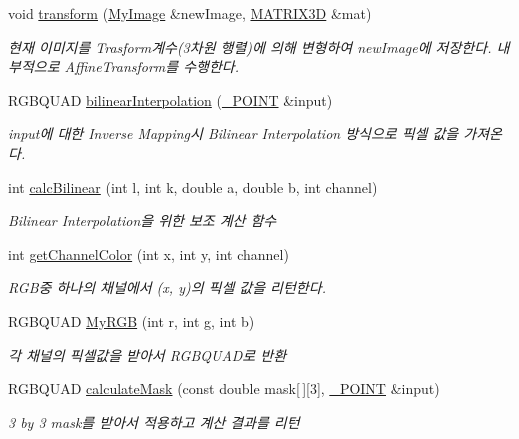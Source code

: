 \begin{DoxyCompactItemize}
\item 
void \hyperlink{class_my_image_a12bac49a024e6c9089a88adb6edca6e1}{transform} (\hyperlink{class_my_image}{My\-Image} \&new\-Image, \hyperlink{class_m_a_t_r_i_x3_d}{M\-A\-T\-R\-I\-X3\-D} \&mat)
\begin{DoxyCompactList}\small\item\em 현재 이미지를 Trasform계수(3차원 행렬)에 의해 변형하여 new\-Image에 저장한다. 내부적으로 Affine\-Transform를 수행한다. \end{DoxyCompactList}\item 
R\-G\-B\-Q\-U\-A\-D \hyperlink{class_my_image_a596dba2536ed1ae57835bf70fcfb1b69}{bilinear\-Interpolation} (\hyperlink{class___p_o_i_n_t}{\-\_\-\-P\-O\-I\-N\-T} \&input)
\begin{DoxyCompactList}\small\item\em input에 대한 Inverse Mapping시 Bilinear Interpolation 방식으로 픽셀 값을 가져온다. \end{DoxyCompactList}\item 
int \hyperlink{class_my_image_a7b7c78fb05bb1378e8ce2a24d8cd3920}{calc\-Bilinear} (int l, int k, double a, double b, int channel)
\begin{DoxyCompactList}\small\item\em Bilinear Interpolation을 위한 보조 계산 함수 \end{DoxyCompactList}\item 
int \hyperlink{class_my_image_af8815f475d86d16653e4295b94fba5af}{get\-Channel\-Color} (int x, int y, int channel)
\begin{DoxyCompactList}\small\item\em R\-G\-B중 하나의 채널에서 (x, y)의 픽셀 값을 리턴한다. \end{DoxyCompactList}\item 
R\-G\-B\-Q\-U\-A\-D \hyperlink{class_my_image_a6deaa1ee63f0944648c18c75a6955ada}{My\-R\-G\-B} (int r, int g, int b)
\begin{DoxyCompactList}\small\item\em 각 채널의 픽셀값을 받아서 R\-G\-B\-Q\-U\-A\-D로 반환 \end{DoxyCompactList}\item 
R\-G\-B\-Q\-U\-A\-D \hyperlink{class_my_image_afec37177692c60c74d1dfba40c890642}{calculate\-Mask} (const double mask\mbox{[}$\,$\mbox{]}\mbox{[}3\mbox{]}, \hyperlink{class___p_o_i_n_t}{\-\_\-\-P\-O\-I\-N\-T} \&input)
\begin{DoxyCompactList}\small\item\em 3 by 3 mask를 받아서 적용하고 계산 결과를 리턴 \end{DoxyCompactList}\item 

\end{DoxyCompactItemize}
